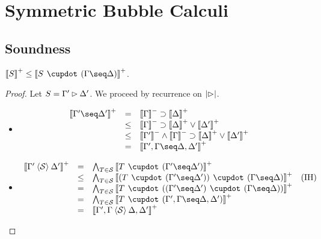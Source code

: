 \setchapterpreamble[u]{\margintoc}
\chapter{Symmetric Bubble Calculi}

\section{Soundness}

\begin{lemma}
  $\psint{S} \sement \psint{S \mix (\Gamma \seq \Delta)}$.
\end{lemma}
\begin{proof}
  Let $S = \Gamma' \mathbin{\rhd} \Delta'$. We proceed by recurrence on $\left|\mathbin{\rhd}\right|$.
  \begin{itemize}
    \item[\bcase]
    $$
    \begin{array}{rcll}
      \psint{\Gamma' \seq \Delta'}
      &=& \nsint{\Gamma} \limp \psint{\Delta} & \\
      &\sement& \nsint{\Gamma} \limp \psint{\Delta} \lor \psint{\Delta'} & \\
      &\sement& \nsint{\Gamma'} \wedge \nsint{\Gamma} \limp \psint{\Delta} \lor \psint{\Delta'} & \\
      &=& \psint{\Gamma', \Gamma \seq \Delta, \Delta'} & \\
    \end{array}
    $$
    \item[\rcase]
    $$
    \begin{array}{rcll}
      \psint{\Gamma' \piq{\cS} \Delta'}
      &=& \bigwedge_{T \in \cS}{\psint{T \mix (\Gamma' \seq \Delta')}} & \\
      &\sement& \bigwedge_{T \in \cS}{\psint{(T \mix (\Gamma' \seq \Delta')) \mix (\Gamma \seq \Delta)}} &\text{(IH)} \\
      &=& \bigwedge_{T \in \cS}{\psint{T \mix ((\Gamma' \seq \Delta') \mix (\Gamma \seq \Delta))}} & \\
      &=& \bigwedge_{T \in \cS}{\psint{T \mix (\Gamma', \Gamma \seq \Delta, \Delta')}} & \\
      &=& \psint{\Gamma', \Gamma \piq{\cS} \Delta, \Delta'} & \\
    \end{array}
    $$
  \end{itemize}
\end{proof}

